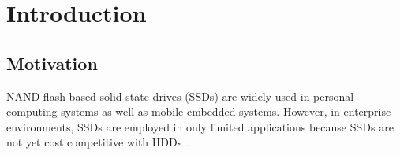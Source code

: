 
\chapter{Introduction} 
\label{chap:Introduction}

\section{Motivation}
\label{sec:Intro_Motivation}

NAND flash-based solid-state drives (SSDs) are widely used in personal computing systems as well as mobile embedded systems.
However, in enterprise environments, SSDs are employed in only limited applications because SSDs are not yet cost competitive with HDDs~\cite{Janus_albrecht}.

